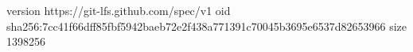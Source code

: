 version https://git-lfs.github.com/spec/v1
oid sha256:7cc41f66dff85fbf5942baeb72e2f438a771391c70045b3695e6537d82653966
size 1398256

